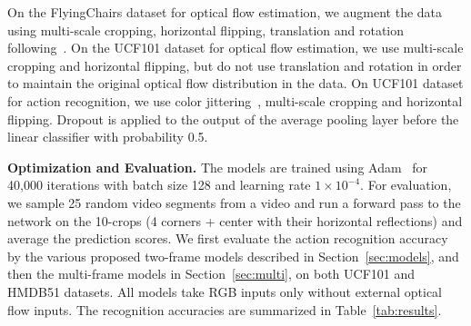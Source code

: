 \documentclass[10pt,twocolumn,letterpaper]{article}
\begin{document}
On the FlyingChairs dataset for optical flow estimation, we augment the data using multi-scale cropping, horizontal flipping, translation and rotation following~\cite{FischerDIHHGSCB15}.
On the UCF101 dataset for optical flow estimation, we use multi-scale cropping and horizontal flipping, but do not use translation and rotation in order to maintain the original optical flow distribution in the data.
On UCF101 dataset for action recognition, we use color jittering~\cite{szegedyLJSRAEVR15}, multi-scale cropping and horizontal flipping.
Dropout is applied to the output of the average pooling layer before the linear classifier with probability 0.5.

\noindent\textbf{Optimization and Evaluation.} The models are trained using Adam~\cite{kingmaB15} for 40,000 iterations with batch size 128 and learning rate $1\times10^{-4}$.
For evaluation, we sample 25 random video segments from a video and run a forward pass to the network on the 10-crops (4 corners + center with their horizontal reflections) and average the prediction scores.%
We first evaluate the action recognition accuracy by the various proposed two-frame models described in Section~\ref{sec:models}, and then the multi-frame models in Section~\ref{sec:multi}, on both UCF101 and HMDB51 datasets.
All models take RGB inputs only without external optical flow inputs.
The recognition accuracies are summarized in Table~\ref{tab:results}.
\end{document}
